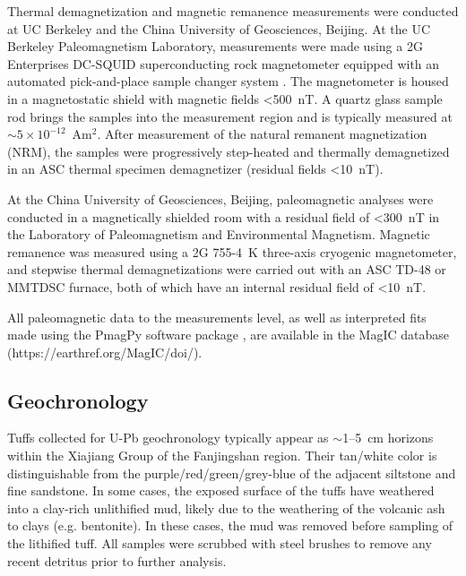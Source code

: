 Thermal demagnetization and magnetic remanence measurements were conducted at UC Berkeley and the China University of Geosciences, Beijing. At the UC Berkeley Paleomagnetism Laboratory, measurements were made using a 2G Enterprises DC-SQUID superconducting rock magnetometer equipped with an automated pick-and-place sample changer system \citep{Kirschvink2008a}. The magnetometer is housed in a magnetostatic shield with magnetic fields \textless500~nT. A quartz glass sample rod brings the samples into the measurement region and is typically measured at $\sim5\times10^{-12}$~Am$^{2}$. After measurement of the natural remanent magnetization (NRM), the samples were progressively step-heated and thermally demagnetized in an ASC thermal specimen demagnetizer (residual fields \textless10~nT).

At the China University of Geosciences, Beijing, paleomagnetic analyses were conducted in a magnetically shielded room with a residual field of \textless300~nT in the Laboratory of Paleomagnetism and Environmental Magnetism. Magnetic remanence was measured using a 2G 755-4~K three-axis cryogenic magnetometer, and stepwise thermal demagnetizations were carried out with an ASC TD-48 or MMTDSC furnace, both of which have an internal residual field of \textless10~nT.

All paleomagnetic data to the measurements level, as well as interpreted fits made using the PmagPy software package \citep{Tauxe2016a}, are available in the MagIC database (https://earthref.org/MagIC/doi/).

\subsection{Geochronology}

Tuffs collected for U-Pb geochronology typically appear as $\sim$1--5~cm horizons within the Xiajiang Group of the Fanjingshan region. Their tan/white color is distinguishable from the purple/red/green/grey-blue of the adjacent siltstone and fine sandstone. In some cases, the exposed surface of the tuffs have weathered into a clay-rich unlithified mud, likely due to the weathering of the volcanic ash to clays (e.g. bentonite). In these cases, the mud was removed before sampling of the lithified tuff. All samples were scrubbed with steel brushes to remove any recent detritus prior to further analysis.


